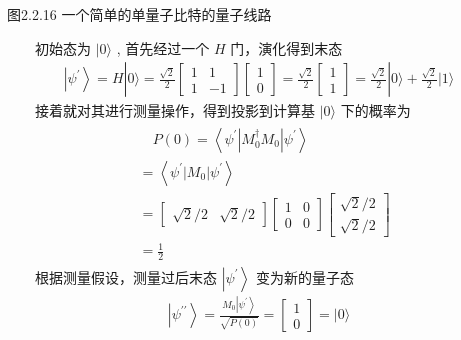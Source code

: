 \documentclass[a4paper,11pt,english]{sphinxmanual}
\begin{document}
\begin{center}图2.2.16 一个简单的单量子比特的量子线路
\end{center}
\sphinxAtStartPar
  初始态为 \(|0\rangle\) , 首先经过一个 \(H\) 门，演化得到末态
\begin{equation*}
\begin{split}\left|\psi^{\prime}\right\rangle=H|0\rangle=\frac{\sqrt{2}}{2}\left[\begin{array}{cc} 1 & 1 \\ 1 & -1 \end{array}\right]\left[\begin{array}{l} 1 \\ 0 \end{array}\right]=\frac{\sqrt{2}}{2}\left[\begin{array}{l} 1 \\ 1 \end{array}\right]=\frac{\sqrt{2}}{2}|0\rangle+\frac{\sqrt{2}}{2}|1\rangle\end{split}
\end{equation*}
\sphinxAtStartPar
  接着就对其进行测量操作，得到投影到计算基 \(|0\rangle\) 下的概率为
\begin{equation*}
\begin{split}\begin{aligned} &\quad P(0)=\left\langle\psi^{\prime}\left|M_{0}^{\dagger} M_{0}\right| \psi^{\prime}\right\rangle \\ &=\left\langle\psi^{\prime}\left|M_{0}\right| \psi^{\prime}\right\rangle \\ &=\left[\begin{array}{ll} \sqrt{2} / 2 & \sqrt{2} / 2 \end{array}\right]\left[\begin{array}{ll} 1 & 0 \\ 0 & 0 \end{array}\right]\left[\begin{array}{l} \sqrt{2} / 2 \\ \sqrt{2} / 2 \end{array}\right] \\ &=\frac{1}{2} \end{aligned}\end{split}
\end{equation*}
\sphinxAtStartPar
  根据测量假设，测量过后末态  \(\left|\psi^{\prime}\right\rangle\) 变为新的量子态
\begin{equation*}
\begin{split}\left|\psi^{\prime \prime}\right\rangle=\frac{M_{0}\left|\psi^{\prime}\right\rangle}{\sqrt{P(0)}}=\left[\begin{array}{l} 1 \\ 0 \end{array}\right]=|0\rangle\end{split}
\end{equation*}
\end{document}
